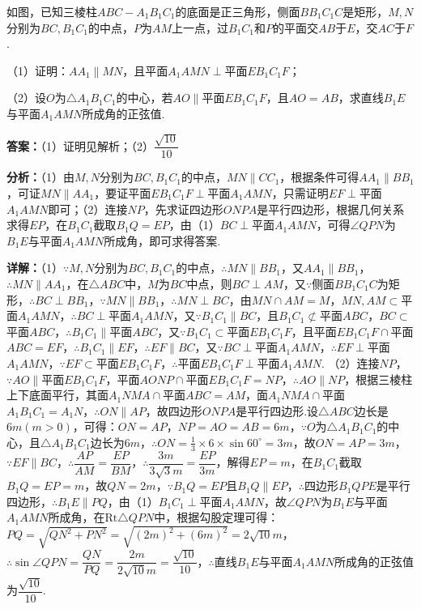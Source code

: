 \begin{question}[points=12]
如图，已知三棱柱$ABC-A_1B_1C_1$的底面是正三角形，侧面$BB_1C_1C$是矩形，$M,N$分别为$BC,B_1C_1$的中点，$P$为$AM$上一点，过$B_1C_1$和$P$的平面交$AB$于$E$，交$AC$于$F$.

（1）证明：$AA_1\parallel MN$，且平面$A_1AMN\perp$平面$EB_1C_1F$；

（2）设$O$为$\triangle A_1B_1C_1$的中心，若$AO\parallel$平面$EB_1C_1F$，且$AO=AB$，求直线$B_1E$与平面$A_1AMN$所成角的正弦值.
\begin{solution}
\textbf{答案：}（1）证明见解析；（2）$\dfrac{\sqrt{10}}{10}$

\textbf{分析：}（1）由$M,N$分别为$BC,B_1C_1$的中点，$MN\parallel CC_1$，根据条件可得$AA_1\parallel BB_1$，可证$MN\parallel AA_1$，要证平面$EB_1C_1F\perp$平面$A_1AMN$，只需证明$EF\perp$平面$A_1AMN$即可；（2）连接$NP$，先求证四边形$ONPA$是平行四边形，根据几何关系求得$EP$，在$B_1C_1$截取$B_1Q=EP$，由（1）$BC\perp$平面$A_1AMN$，可得$\angle QPN$为$B_1E$与平面$A_1AMN$所成角，即可求得答案.

\textbf{详解：}（1）$\because M,N$分别为$BC,B_1C_1$的中点，$\therefore MN\parallel BB_1$，又$AA_1\parallel BB_1$，$\therefore MN\parallel AA_1$，在$\triangle ABC$中，$M$为$BC$中点，则$BC\perp AM$，又$\because$侧面$BB_1C_1C$为矩形，$\therefore BC\perp BB_1$，$\because MN\parallel BB_1$，$\therefore MN\perp BC$，由$MN\cap AM=M$，$MN,AM\subset$平面$A_1AMN$，$\therefore BC\perp$平面$A_1AMN$，又$\because B_1C_1\parallel BC$，且$B_1C_1\not\subset$平面$ABC$，$BC\subset$平面$ABC$，$\therefore B_1C_1\parallel$平面$ABC$，又$\because B_1C_1\subset$平面$EB_1C_1F$，且平面$EB_1C_1F\cap$平面$ABC=EF$，$\therefore B_1C_1\parallel EF$，$\therefore EF\parallel BC$，又$\because BC\perp$平面$A_1AMN$，$\therefore EF\perp$平面$A_1AMN$，$\because EF\subset$平面$EB_1C_1F$，$\therefore$平面$EB_1C_1F\perp$平面$A_1AMN$.
（2）连接$NP$，$\because AO\parallel$平面$EB_1C_1F$，平面$AONP\cap$平面$EB_1C_1F=NP$，$\therefore AO\parallel NP$，根据三棱柱上下底面平行，其面$A_1NMA\cap$平面$ABC=AM$，面$A_1NMA\cap$平面$A_1B_1C_1=A_1N$，$\therefore ON\parallel AP$，故四边形$ONPA$是平行四边形.设$\triangle ABC$边长是$6m(m>0)$，可得：$ON=AP$，$NP=AO=AB=6m$，$\because O$为$\triangle A_1B_1C_1$的中心，且$\triangle A_1B_1C_1$边长为$6m$，$\therefore ON=\frac13\times6\times\sin60^\circ=3m$，故$ON=AP=3m$，$\because EF\parallel BC$，$\therefore\dfrac{AP}{AM}=\dfrac{EP}{BM}$，$\therefore\dfrac{3m}{3\sqrt3m}=\dfrac{EP}{3m}$，解得$EP=m$，在$B_1C_1$截取$B_1Q=EP=m$，故$QN=2m$，$\because B_1Q=EP$且$B_1Q\parallel EP$，$\therefore$四边形$B_1QPE$是平行四边形，$\therefore B_1E\parallel PQ$，由（1）$B_1C_1\perp$平面$A_1AMN$，故$\angle QPN$为$B_1E$与平面$A_1AMN$所成角，在$\text{Rt}\triangle QPN$中，根据勾股定理可得：$PQ=\sqrt{QN^2+PN^2}=\sqrt{(2m)^2+(6m)^2}=2\sqrt{10}m$，$\therefore\sin\angle QPN=\dfrac{QN}{PQ}=\dfrac{2m}{2\sqrt{10}m}=\dfrac{\sqrt{10}}{10}$，$\therefore$直线$B_1E$与平面$A_1AMN$所成角的正弦值为$\dfrac{\sqrt{10}}{10}$.
\end{solution}
\end{question}

